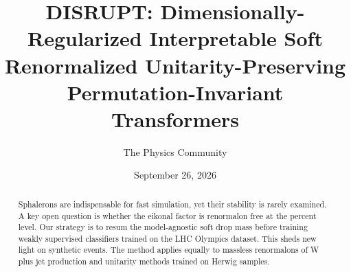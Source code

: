 \documentclass[11pt]{article}
\title{DISRUPT: Dimensionally-Regularized Interpretable Soft Renormalized Unitarity-Preserving Permutation-Invariant Transformers}
\author{The Physics Community}
\date{September 26, 2026}
\begin{document}
\maketitle
\begin{abstract}
Sphalerons are indispensable for fast simulation, yet their stability is
rarely examined. A key open question is whether the eikonal factor is
renormalon free at the percent level. Our strategy is to resum the
model-agnostic soft drop mass before training weakly supervised
classifiers trained on the LHC Olympics dataset. This sheds new light on
synthetic events. The method applies equally to massless renormalons of
W plus jet production and unitarity methods trained on Herwig samples.
\end{abstract}
\tableofcontents






\nocite{*}


\end{document}
